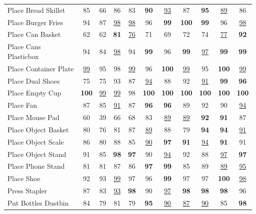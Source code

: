 \begin{center}
\begin{minipage}{\linewidth}
\begin{tabular*}{\linewidth}{@{\extracolsep{\fill}}l*{10}{c}@{}}
        Place Bread Skillet & 85 & 66 & 86 & 83 & \textbf{90} & \underline{93} & 87 & \textbf{95} & \underline{89} & 86 \\
        Place Burger Fries & 94 & 87 & \underline{98} & \underline{98} & 96 & \textbf{99} & \textbf{100} & \textbf{99} & 96 & \underline{98} \\
        Place Can Basket & 62 & 62 & \textbf{81} & \underline{76} & 71 & 69 & 72 & 74 & \underline{77} & \textbf{92} \\
        Place Cans Plasticbox & 94 & 84 & \underline{98} & 94 & \textbf{99} & 96 & \textbf{99} & \underline{97} & \textbf{99} & \textbf{99} \\
        Place Container Plate & \underline{99} & 95 & 98 & \underline{99} & 96 & \textbf{100} & \underline{99} & 95 & \textbf{100} & \underline{99} \\
        Place Dual Shoes & 75 & 75 & 93 & 87 & \underline{94} & 88 & 92 & \underline{91} & \textbf{99} & \textbf{96} \\
        Place Empty Cup & \textbf{100} & \underline{99} & \underline{99} & 98 & \textbf{100} & \textbf{100} & \textbf{100} & \textbf{100} & \textbf{100} & \textbf{100} \\
        Place Fan & 87 & 85 & \underline{91} & 87 & \textbf{96} & \textbf{96} & 89 & 92 & 90 & \underline{94} \\
        Place Mouse Pad & 60 & 39 & 66 & 68 & 83 & \underline{89} & \underline{89} & \textbf{92} & \textbf{91} & 87 \\
        Place Object Basket & 80 & 76 & 81 & 87 & \underline{89} & 88 & 79 & \textbf{94} & \textbf{94} & \underline{91} \\
        Place Object Scale & 86 & 80 & 88 & 85 & \underline{90} & \textbf{97} & \textbf{91} & \underline{94} & \textbf{91} & 91 \\
        Place Object Stand & 91 & 85 & \textbf{98} & \textbf{97} & 90 & \underline{94} & 92 & 88 & \underline{97} & \textbf{97} \\
        Place Phone Stand & 81 & 81 & 87 & 86 & \textbf{97} & \textbf{99} & 85 & 89 & \underline{89} & \underline{95} \\
        Place Shoe & 92 & 93 & \underline{99} & 97 & 96 & \textbf{99} & 97 & 97 & \textbf{100} & \underline{98} \\
        Press Stapler & 87 & 83 & \underline{93} & \textbf{98} & 90 & \underline{97} & \textbf{98} & \textbf{98} & \textbf{98} & 96 \\
        Put Bottles Dustbin & 84 & 79 & 81 & 79 & \textbf{95} & \underline{90} & \underline{87} & \underline{90} & 85 & \textbf{98} \\

\end{tabular*}
\end{minipage}
\end{center}
